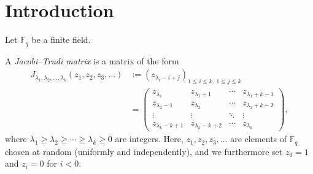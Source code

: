 \documentclass[numbers=enddot,12pt,final,onecolumn,notitlepage]{scrartcl}%
\theoremstyle{definition}
\newcommand{\tup}[1]{\left( #1 \right)}
\newcommand{\Fq}{\mathbb{F}_q}
\renewcommand{\leq}{\leqslant}
\renewcommand{\geq}{\geqslant}
\theoremstyle{plainsl}
\begin{document}
\section{\label{sec.introduction}Introduction}

Let $\mathbb{F}_q$ be a finite field.

A \emph{Jacobi--Trudi matrix} is a matrix of the form
\begin{align*}
J_{\lambda_1, \lambda_2, \ldots, \lambda_k}\tup{z_1, z_2, z_3, \ldots}
&:=
\left(  z_{\lambda_{i}-i+j}\right)_{1\leq i\leq k,\ 1\leq j\leq k}
\\
&= \begin{pmatrix}
z_{\lambda_1} & z_{\lambda_1 + 1} & \cdots & z_{\lambda_1 + k-1} \\
z_{\lambda_2 - 1} & z_{\lambda_2} & \cdots & z_{\lambda_2 + k-2} \\
\vdots & \vdots & \ddots & \vdots \\
z_{\lambda_k - k+1} & z_{\lambda_k - k+2} & \cdots & z_{\lambda_k}
\end{pmatrix} ,
\end{align*}
where $\lambda_{1} \geq \lambda_{2} \geq \cdots \geq \lambda_{k} \geq 0$ are integers.
Here, $z_1, z_2, z_3, \ldots$ are elements of $\Fq$ chosen at random (uniformly and independently), and we furthermore set $z_{0}=1$ and $z_{i}=0$ for $i<0$.
\end{document}
